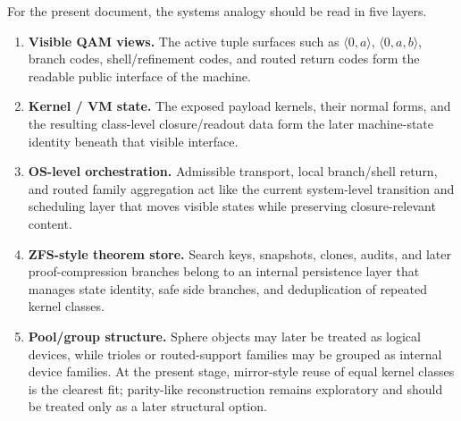 \begin{remark}\label{rem:qam-vm-os-reading}
For the present document, the systems analogy should be read in five layers.
\begin{enumerate}[leftmargin=2em]
 \item \textbf{Visible QAM views.} The active tuple surfaces such as $\langle 0,a\rangle$, $\langle 0,a,b\rangle$, branch codes, shell/refinement codes, and routed return codes form the readable public interface of the machine.
 \item \textbf{Kernel / VM state.} The exposed payload kernels, their normal forms, and the resulting class-level closure/readout data form the later machine-state identity beneath that visible interface.
 \item \textbf{OS-level orchestration.} Admissible transport, local branch/shell return, and routed family aggregation act like the current system-level transition and scheduling layer that moves visible states while preserving closure-relevant content.
 \item \textbf{ZFS-style theorem store.} Search keys, snapshots, clones, audits, and later proof-compression branches belong to an internal persistence layer that manages state identity, safe side branches, and deduplication of repeated kernel classes.
 \item \textbf{Pool/group structure.} Sphere objects may later be treated as logical devices, while trioles or routed-support families may be grouped as internal device families. At the present stage, mirror-style reuse of equal kernel classes is the clearest fit; parity-like reconstruction remains exploratory and should be treated only as a later structural option.
\end{enumerate}
\end{remark}


